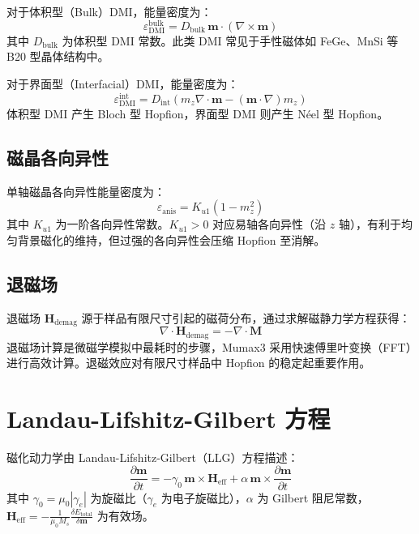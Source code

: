 对于体积型（Bulk）DMI，能量密度为：
\begin{equation}
  \varepsilon_{\text{DMI}}^{\text{bulk}} = D_{\text{bulk}} \, \mathbf{m} \cdot (\nabla \times \mathbf{m})
  \label{eq:dmi-bulk}
\end{equation}
其中 $D_{\text{bulk}}$ 为体积型 DMI 常数。此类 DMI 常见于手性磁体如 FeGe、MnSi 等 B20 型晶体结构中。

对于界面型（Interfacial）DMI，能量密度为：
\begin{equation}
  \varepsilon_{\text{DMI}}^{\text{int}} = D_{\text{int}} \left( m_z \nabla \cdot \mathbf{m} - (\mathbf{m} \cdot \nabla) m_z \right)
  \label{eq:dmi-int}
\end{equation}
体积型 DMI 产生 Bloch 型 Hopfion，界面型 DMI 则产生 N\'{e}el 型 Hopfion。

\subsection{磁晶各向异性}

单轴磁晶各向异性能量密度为：
\begin{equation}
  \varepsilon_{\text{anis}} = K_{u1} (1 - m_z^2)
  \label{eq:anisotropy}
\end{equation}
其中 $K_{u1}$ 为一阶各向异性常数。$K_{u1} > 0$ 对应易轴各向异性（沿 $z$ 轴），有利于均匀背景磁化的维持，但过强的各向异性会压缩 Hopfion 至消解。

\subsection{退磁场}

退磁场 $\mathbf{H}_{\text{demag}}$ 源于样品有限尺寸引起的磁荷分布，通过求解磁静力学方程获得：
\begin{equation}
  \nabla \cdot \mathbf{H}_{\text{demag}} = -\nabla \cdot \mathbf{M}
  \label{eq:demag}
\end{equation}
退磁场计算是微磁学模拟中最耗时的步骤，Mumax3 采用快速傅里叶变换（FFT）进行高效计算。退磁效应对有限尺寸样品中 Hopfion 的稳定起重要作用。


\section{Landau-Lifshitz-Gilbert 方程}

磁化动力学由 Landau-Lifshitz-Gilbert（LLG）方程描述：
\begin{equation}
  \frac{\partial \mathbf{m}}{\partial t} = -\gamma_0 \, \mathbf{m} \times \mathbf{H}_{\text{eff}} + \alpha \, \mathbf{m} \times \frac{\partial \mathbf{m}}{\partial t}
  \label{eq:llg}
\end{equation}
其中 $\gamma_0 = \mu_0 |\gamma_e|$ 为旋磁比（$\gamma_e$ 为电子旋磁比），$\alpha$ 为 Gilbert 阻尼常数，$\mathbf{H}_{\text{eff}} = -\frac{1}{\mu_0 M_s}\frac{\delta E_{\text{total}}}{\delta \mathbf{m}}$ 为有效场。

